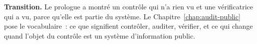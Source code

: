 \begin{boxinfo}
\textbf{Transition.} Le prologue a montré un contrôle qui n'a rien vu et
une vérificatrice qui a vu, parce qu'elle est partie du système. Le
Chapitre~\ref{chap:audit-public} pose le vocabulaire~: ce que signifient
contrôler, auditer, vérifier, et ce qui change quand l'objet du contrôle
est un système d'information public.
\end{boxinfo}
